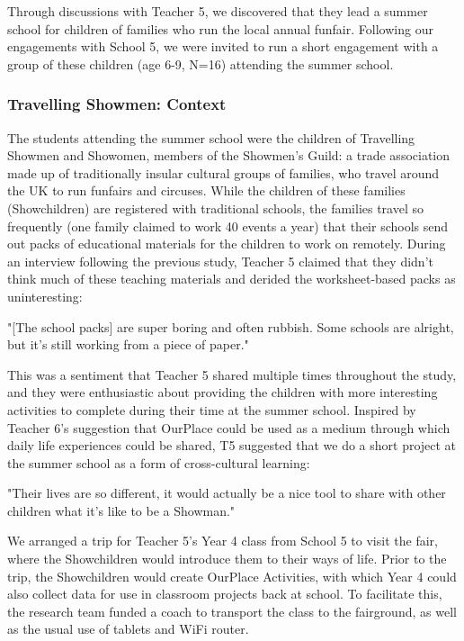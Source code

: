 Through discussions with Teacher 5, we discovered that they lead a summer school for children of families who run the local annual funfair. Following our engagements with School 5, we were invited to run a short engagement with a group of these children (age 6-9, N=16) attending the summer school.

\subsubsection{Travelling Showmen: Context}

The students attending the summer school were the children of Travelling Showmen and Showomen, members of the Showmen's Guild: a trade association made up of traditionally insular cultural groups of families, who travel around the UK to run funfairs and circuses. While the children of these families (Showchildren) are registered with traditional schools, the families travel so frequently (one family claimed to work 40 events a year) that their schools send out packs of educational materials for the children to work on remotely. During an interview following the previous study, Teacher 5 claimed that they didn't think much of these teaching materials and derided the worksheet-based packs as uninteresting: 

\begin{displayquote}
"[The school packs] are super boring and often rubbish. Some schools are alright, but it's still working from a piece of paper."
\end{displayquote}

This was a sentiment that Teacher 5 shared multiple times throughout the study, and they were enthusiastic about providing the children with more interesting activities to complete during their time at the summer school. Inspired by Teacher 6's suggestion that OurPlace could be used as a medium through which daily life experiences could be shared, T5 suggested that we do a short project at the summer school as a form of cross-cultural learning: 
\begin{displayquote}
"Their lives are so different, it would actually be a nice tool to share with other children what it's like to be a Showman."
\end{displayquote}

We arranged a trip for Teacher 5's Year 4 class from School 5 to visit the fair, where the Showchildren would introduce them to their ways of life. Prior to the trip, the Showchildren would create OurPlace Activities, with which Year 4 could also collect data for use in classroom projects back at school. To facilitate this, the research team funded a coach to transport the class to the fairground, as well as the usual use of tablets and WiFi router.

